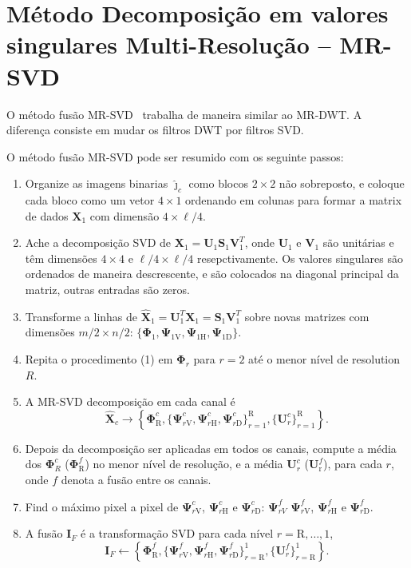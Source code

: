\section{Método Decomposição em valores singulares Multi-Resolução -- MR-SVD}
O método fusão MR-SVD~\cite{naidu} trabalha de maneira similar ao MR-DWT. A diferença consiste em mudar os filtros DWT por filtros SVD.

O método fusão MR-SVD pode ser resumido com os seguinte passos: 
\begin{enumerate}
\item Organize as imagens binarias $\bm{\widehat\jmath}_c$ como blocos $2\times 2$ não sobreposto, e coloque cada bloco como um vetor $4\times 1$ ordenando em colunas para formar a matrix de dados $\bm X_1$ com dimensão ${4\times{\ell}/{4}}$.   
\item Ache a decomposição SVD de  $\bm X_1=\bm U_1 \bm S_1 \bm V_1^T$, onde $\bm U_1$ e $\bm V_1$ são unitárias e têm dimensões ${4\times 4}$ e ${\ell}/{4}\times{\ell}/{4}$ resepctivamente. Os valores singulares são ordenados de maneira descrescente, e são colocados na diagonal principal da matriz, outras entradas são zeros.  
\item Transforme a linhas de $\widehat{\bm X}_1=\bm U_1^T\bm X_1=\bm S_1 \bm V_1^T$ sobre novas matrizes com dimensões ${m}/{2}\times{n}/{2}$: $\{\bm\Phi_1, \bm\Psi_{1\text{V}}, \bm\Psi_{1\text{H}}, \bm\Psi_{1\text{D}}\}$. 
\item Repita o procedimento (1) em $\bm\Phi_r$ para $r=2$ até o menor nível de resolution $R$.
\item A MR-SVD decomposição em cada canal é  
\begin{equation}\nonumber
\widehat{\bm X}_c\rightarrow \left\{\bm \Phi_\text{R}^c,\{\bm\Psi_{r\text{V}}^c,\bm\Psi_{r\text{H}}^c,\bm\Psi_{r\text{D}}^c \}_{r=1}^\text{R},\{\bm U_r^c	\}_{r=1}^\text{R} \right\}.
\end{equation}
\item Depois da decomposição ser aplicadas em todos os canais, compute a média dos $\bm\Phi_R^c$ ($\bm\Phi_\text{R}^f$) no menor nível de resolução, e a média $\bm U_r^c$ ($\bm U_\text{r}^f$), para cada $r$, onde $f$ denota a fusão entre os canais.  
\item Find o máximo pixel a pixel de $\bm\Psi_{r\text{V}}^c$, $\bm\Psi_{r\text{H}}^c$ e $\bm\Psi_{r\text{D}}^c$: $ \bm\Psi_{rV}^f$ $\bm\Psi_{r\text{V}}^f$, $\bm\Psi_{r\text{H}}^f$ e $\bm\Psi_{r\text{D}}^f$.
\item A fusão $\bm I_F$ é a transformação SVD para cada nível $r=\text{R},\dots,1$, 
\begin{equation}\nonumber
\bm I_F\leftarrow \left\{\bm \Phi_\text{R}^f,\{\bm\Psi_{r\text{V}}^f,\bm\Psi_{r\text{H}}^f,\bm\Psi_{r\text{D}}^f \}_{r=\text{R}}^1,\{\bm U_r^f\}_{r=\text{R}}^1 \right\}.
\end{equation}
\end{enumerate}


